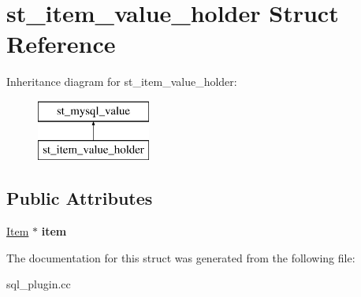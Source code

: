 \hypertarget{structst__item__value__holder}{}\section{st\+\_\+item\+\_\+value\+\_\+holder Struct Reference}
\label{structst__item__value__holder}
Inheritance diagram for st\+\_\+item\+\_\+value\+\_\+holder\+:\begin{figure}[H]
\begin{center}
\leavevmode
\includegraphics[height=2.000000cm]{structst__item__value__holder}
\end{center}
\end{figure}
\subsection*{Public Attributes}
\begin{DoxyCompactItemize}
\item 
\mbox{\label{structst__item__value__holder_aa7870e917c784b887216c6ad32c45587}} 
\mbox{\hyperlink{classItem}{Item}} $\ast$ {\bfseries item}
\end{DoxyCompactItemize}


The documentation for this struct was generated from the following file\+:\begin{DoxyCompactItemize}
\item 
sql\+\_\+plugin.\+cc\end{DoxyCompactItemize}
